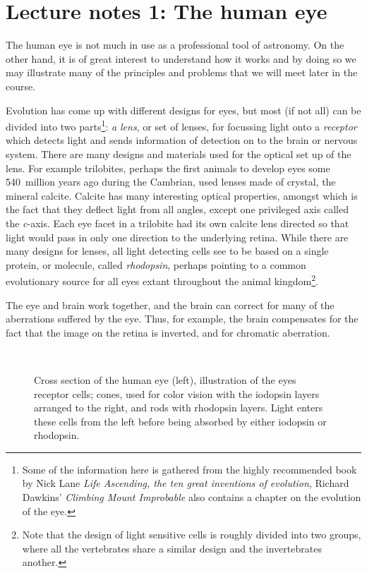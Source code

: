 \documentclass{article}
\begin{document}
\section*{Lecture notes 1: The human eye}

The human eye is not much in use as a professional tool of
astronomy. On the other hand, it is of great interest to understand how it
works and by doing so we may illustrate many of the principles and
problems that we will meet later in the course.

Evolution has come up with different designs for eyes, but most (if
not all) can be divided into two parts\footnote{Some of the
  information here is gathered from the highly recommended book by
  Nick Lane {\it Life Ascending, the ten great inventions of
    evolution}, Richard Dawkins' {\it Climbing Mount
    Improbable} also contains a chapter on the evolution of the eye.}:
{\it a lens}, or set of lenses, for
focussing light onto a {\it receptor} which detects light and sends
information of detection on to the brain or nervous system. There are
many designs and materials used for the optical set up of the
lens. For example trilobites, perhaps the first animals to develop
eyes some 540~million years ago during the Cambrian, used lenses made
of crystal, the mineral calcite. Calcite has many interesting optical
properties, amongst which is the fact that they deflect light from all
angles, except one privileged axis called the {\it c}-axis. Each eye
facet in a trilobite had its own calcite lens directed so that light
would pass in only one direction to the underlying retina. While there
are many designs for lenses, all light detecting cells see to be based
on a single protein, or molecule, called {\it rhodopsin}, perhaps
pointing to a common evolutionary source for all eyes extant
throughout the animal kingdom\footnote{Note that the design
  of light sensitive cells is roughly divided into two groups, where
  all the vertebrates share a similar design and the invertebrates another.}.

The eye and brain work together, and the brain can correct for many of
the aberrations suffered by the eye. Thus, for example, the brain compensates for
the fact that the image on the retina is inverted, and for chromatic
aberration. 

\begin{figure}[h!]
\hbox{
}
\caption{Cross section of the human eye (left), illustration of the eyes
receptor cells; cones, used for color vision with the iodopsin layers 
arranged to the right, and rods with rhodopsin layers. Light enters these
cells from the left before being absorbed by either iodopsin or rhodopsin.}
\end{figure}
\end{document}
